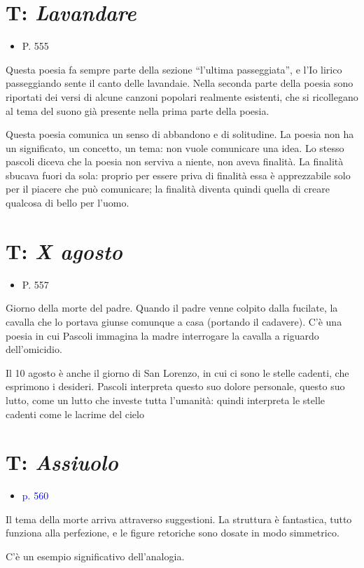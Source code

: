 \documentclass[a4paper, twoside, titlepage]{book}
\newcommand{\elenco}[1]{%
\begin{itemize}
#1
\end{itemize}}
\renewcommand{\emph}[1]{\textcolor{blue}{#1}}
\begin{document}
\section{T: \textit{Lavandare}}
\elenco{\item P. 555}

Questa poesia fa sempre parte della sezione “l’ultima passeggiata”, e l’Io lirico passeggiando sente il canto delle lavandaie.
Nella seconda parte della poesia sono riportati dei versi di alcune canzoni popolari realmente esistenti, che si ricollegano al tema del suono già presente nella prima parte della poesia.

Questa poesia comunica un senso di abbandono e di solitudine. La poesia non ha un significato, un concetto, un tema: non vuole comunicare una idea.
Lo stesso pascoli diceva che la poesia non serviva a niente, non aveva finalità. La finalità sbucava fuori da sola: proprio per essere priva di finalità essa è apprezzabile solo per il piacere che può comunicare; la finalità diventa quindi quella di creare qualcosa di bello per l’uomo.

\section{T: \textit{X agosto}}
\elenco{\item P. 557}

Giorno della morte del padre.
Quando il padre venne colpito dalla fucilate, la cavalla che lo portava giunse comunque a casa (portando il cadavere).
C’è una poesia in cui Pascoli immagina la madre interrogare la cavalla a riguardo dell’omicidio.

Il 10 agosto è anche il giorno di San Lorenzo, in cui ci sono le stelle cadenti, che esprimono i desideri.
Pascoli interpreta questo suo dolore personale, questo suo lutto, come un lutto che investe tutta l’umanità: quindi interpreta le stelle cadenti come le lacrime del cielo


\section{T: \textit{Assiuolo}}
\elenco{\item \emph{p. 560}}

Il tema della morte arriva attraverso suggestioni.
La struttura è fantastica, tutto funziona alla perfezione, e le figure retoriche sono dosate in modo simmetrico.

C'è un esempio significativo dell'analogia.
\end{document}
